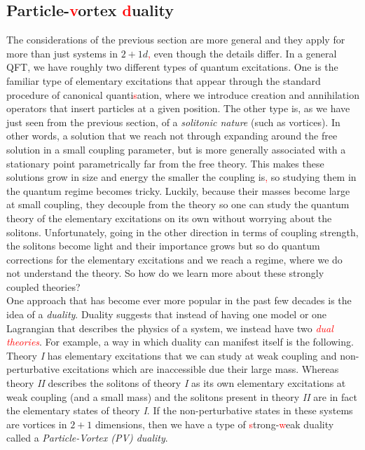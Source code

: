     \subsection{Particle-\textcolor{red}{v}ortex \textcolor{red}{d}uality}
    The considerations of the previous section are more general and they apply for more than just systems in $2+1d$\textcolor{red}{,} even though the details differ. In a general QFT, we have roughly two different types of quantum excitations. One is the familiar type of elementary excitations that appear through the standard procedure of canonical quanti\textcolor{red}{s}ation, where we introduce creation and annihilation operators that insert particles at a given position. The other type is, as we have just seen from the previous section, of a \textit{solitonic nature} (such as vortices). In other words, a solution that we reach not through expanding around the free solution in a small coupling parameter, but is more generally associated with a stationary point parametrically far from the free theory. This makes these solutions grow in size and energy the smaller the coupling is\textcolor{red}{,} so studying them in the quantum regime becomes tricky. Luckily, because their masses become large at small coupling, they decouple from the theory so one can study the quantum theory of the elementary excitations on its own without worrying about the solitons. Unfortunately, going in the other direction in terms of coupling strength, the solitons become light and their importance grows but so do quantum corrections for the elementary excitations and we reach a regime, where we do not understand the theory. So how do we learn more about these strongly coupled theories? \\
    \indent One approach that has become ever more popular in the past few decades is the idea of a \textit{duality}. Duality suggests that instead of having one model or one Lagrangian that describes the physics of a system, we instead have two \textcolor{red}{\textit{dual theories}}. For example, a way in which duality can manifest itself is the following. Theory \textit{I} has elementary excitations that we can study at weak coupling and non-perturbative excitations which are inaccessible due their large mass. Whereas theory \textit{II} describes the solitons of theory \textit{I} as its own elementary excitations at weak coupling (and a small mass) and the solitons present in theory \textit{II} are in fact the elementary states of theory \textit{I}. If the non-perturbative states in these systems are vortices in $2+1$ dimensions, then we have a type of \textcolor{red}{s}trong-\textcolor{red}{w}eak duality called a \textit{Particle-Vortex (PV) duality}. \\
